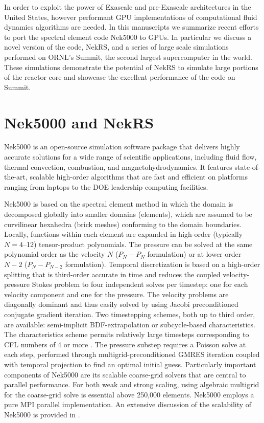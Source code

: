 \documentclass{anstrans}
\begin{document}
In order to exploit the power of Exascale and pre-Exascale architectures in the United States,  however performant GPU implementations of computational fluid dynamics algorithms are needed. In this manuscripts we summarize recent efforts to port the spectral element code Nek5000 \cite{fischer2015nek5000} to GPUs. In particular we discuss a novel version of the code, NekRS, and a series of large scale simulations performed on ORNL's Summit, the second largest supercomputer in the world. These simulations demonstrate the potential of NekRS to simulate large portions of the reactor core and showcase the excellent performance of the code on Summit.

\section{Nek5000 and NekRS}

Nek5000 \cite{fischer2015nek5000} is an open-source simulation software package
that delivers highly accurate solutions for a wide range of scientific
applications, including fluid flow, thermal convection, combustion, and
magnetohydrodynamics. It features state-of-the-art, scalable high-order
algorithms that are fast and efficient on platforms ranging from laptops to the
DOE leadership computing facilities.

Nek5000 is based on the spectral element method \cite{patera1984} in which  the
domain is decomposed globally into smaller domains (elements), which are
assumed to be curvilinear hexahedra (brick meshes) conforming to the domain
boundaries. Locally, functions within each element are expanded in high-order
(typically $N=4$--12) tensor-product polynomials.  The pressure can be solved
at the same polynomial order as the velocity $N$ ($P_{N} - P_{N}$ formulation)
or at lower order $N-2$ ($P_{N} - P_{N-2}$ formulation).  Temporal
discretization is based on a high-order splitting that is third-order accurate
in time and reduces the coupled velocity-pressure Stokes problem to four
independent solves per timestep: one for each velocity component and one for
the pressure. The velocity problems are diagonally dominant and thus easily
solved by using Jacobi preconditioned conjugate gradient iteration. Two
timestepping schemes, both up to third order, are available: semi-implicit
BDF-extrapolation or subcycle-based characteristics. The characteristics
scheme permits relatively large timesteps corresponding to CFL numbers
of 4 or more \cite{patel19}. The pressure substep requires a Poisson solve
at each step, performed through multigrid-preconditioned GMRES iteration
coupled with temporal projection to find an optimal initial guess.
Particularly important components of Nek5000 are its scalable coarse-grid
solvers that are central to parallel performance. For both weak and
strong scaling, using algebraic multigrid for the coarse-grid solve is
essential above 250,000 elements. Nek5000 employs a pure MPI parallel
implementation.  An extensive discussion of the scalability of Nek5000 is
provided in \cite{fischer15,fischer20a}.
\end{document}

